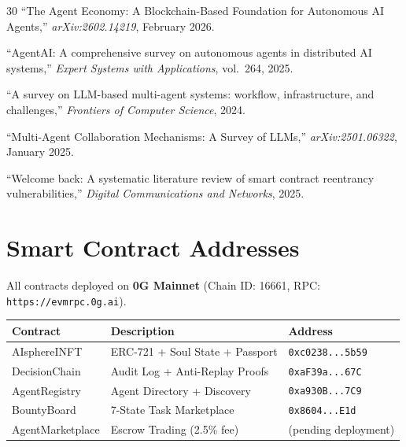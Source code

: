 \documentclass[10pt,a4paper]{article}
\theoremstyle{definition}
\theoremstyle{plain}
\begin{document}
\begin{thebibliography}{30}
``The Agent Economy: A Blockchain-Based Foundation for Autonomous AI Agents,'' \textit{arXiv:2602.14219}, February 2026.

``AgentAI: A comprehensive survey on autonomous agents in distributed AI systems,'' \textit{Expert Systems with Applications}, vol.~264, 2025.

``A survey on LLM-based multi-agent systems: workflow, infrastructure, and challenges,'' \textit{Frontiers of Computer Science}, 2024.

``Multi-Agent Collaboration Mechanisms: A Survey of LLMs,'' \textit{arXiv:2501.06322}, January 2025.

``Welcome back: A systematic literature review of smart contract reentrancy vulnerabilities,'' \textit{Digital Communications and Networks}, 2025.

\end{thebibliography}


\newpage
\appendix

\section{Smart Contract Addresses}
\label{app:contracts}

All contracts deployed on \textbf{0G Mainnet} (Chain ID: 16661, RPC: \texttt{https://evmrpc.0g.ai}).

\begin{table}[H]
\centering
\renewcommand{\arraystretch}{1.15}
\footnotesize
\begin{tabularx}{\textwidth}{@{}lXl@{}}
\toprule
\textbf{Contract} & \textbf{Description} & \textbf{Address} \\
\midrule
AIsphereINFT     & ERC-721 + Soul State + Passport & \texttt{0xc0238...5b59} \\
DecisionChain    & Audit Log + Anti-Replay Proofs  & \texttt{0xaF39a...67C} \\
AgentRegistry    & Agent Directory + Discovery      & \texttt{0xa930B...7C9} \\
BountyBoard      & 7-State Task Marketplace         & \texttt{0x8604...E1d} \\
AgentMarketplace & Escrow Trading (2.5\% fee)       & (pending deployment) \\
\bottomrule
\end{tabularx}
\end{table}
\end{document}

